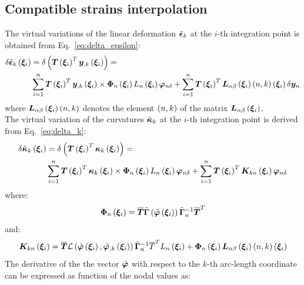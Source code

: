 \subsection{Compatible strains interpolation}
The virtual variations of the linear deformation $\tilde{\bm{\epsilon} }_k $ at the $i$-th integration point is obtained from Eq.~\ref{eq:delta_epsilon}:
\begin{equation}
\begin{split}
\delta \tilde{\bm{\epsilon} }_k \left(  \bm{ \xi }_{ i }  \right) & = \delta \left(  \bm{T}\left(  \bm{ \xi }_{ i }  \right)^T \bm{y}_{,k} \left(  \bm{ \xi }_{ i }  \right)  \right) = \\
& \sum_{i=1}^n \bm{T}\left(  \bm{ \xi }_{ i }  \right)^T \bm{y}_{,k}\left(  \bm{ \xi }_{ i }  \right) \times \bm{\Phi}_{n} \left(  \bm{ \xi }_{ i }  \right) L_n \left(  \bm{ \xi }_{ i }  \right) \bm{\varphi}_{n \delta} + \sum_{i=1}^n \bm{T}\left(  \bm{ \xi }_{ i }  \right)^T \bm{L}_{\alpha \beta} \left(  \bm{ \xi }_{ i }  \right) \left(  n, k  \right) \left(  \bm{ \xi }_{ i }  \right) \delta \bm{y}_{n}
\end{split}
\label{eq:delta_epsilon_i}
\end{equation}
where $\bm{L}_{\alpha \beta} \left(  \bm{ \xi }_{ i }  \right) \left(  n, k  \right)$ denotes the element $\left( n, k \right)$ of the matrix $\bm{L}_{\alpha \beta} \left(  \bm{ \xi }_{ i }  \right)$.\\
The  virtual variation of the curvatures $\tilde{\bm{\kappa} }_k$ at the $i$-th integration point is derived from Eq.~\ref{eq:delta_k}:
\begin{equation}
\begin{split}
\delta \tilde{\bm{\kappa} }_k \left(  \bm{ \xi }_{ i }  \right) & = \delta \left(  \bm{T}\left(  \bm{ \xi }_{ i }  \right)^T \bm{\kappa}_k \left(  \bm{ \xi }_{ i }  \right) \right) =  \\
& \sum_{i=1}^n \bm{T}\left(  \bm{ \xi }_{ i }  \right)^T \bm{\kappa}_k\left(  \bm{ \xi }_{ i }  \right) \times \bm{\Phi}_n\left(  \bm{ \xi }_{ i }  \right) L_n\left(  \bm{ \xi }_{ i }  \right) \bm{\varphi}_{n \delta} + \sum_{i=1}^n \bm{T}\left(  \bm{ \xi }_{ i }  \right)^T \bm{K}_{kn}\left(  \bm{ \xi }_{ i }  \right) \bm{\varphi}_{n \delta}
\end{split}
\label{eq:delta_k_i}
\end{equation}
where:
\begin{equation}
\bm{\Phi}_{n} \left(  \bm{ \xi }_{ i }  \right) = \overline{\bm{T}}  \tilde{ \bm{\Gamma} } \left(  \tilde{\bm{\varphi}} \left(  \bm{ \xi }_{ i }  \right)  \right) \tilde{ \bm{\Gamma} }_n^{-1} \overline{\bm{T}}^T
\end{equation}
and:
\begin{equation}
\bm{K}_{kn} \left(  \bm{ \xi }_{ i }  \right) =
\overline{\bm{T}} \mathcal{L} \left(  \tilde{\bm{\varphi}}\left(  \bm{ \xi }_{ i }  \right), \tilde{\bm{\varphi}}_{,k}\left(  \bm{ \xi }_{ i }  \right)  \right) \tilde{ \bm{\Gamma} }_{n}^{-1} \overline{T}^T L_n\left(  \bm{ \xi }_{ i }  \right) + \bm{\Phi}_{n}\left(  \bm{ \xi }_{ i }  \right) \bm{L}_{\alpha \beta} \left(  \bm{ \xi }_{ i }  \right) \left(  n, k  \right) \left(  \bm{ \xi }_{ i }  \right)
\end{equation}
The derivative of the the vector $\tilde{\bm{\varphi}}$ with respect to the $k$-th arc-length coordinate can be expressed as function of the nodal values as:

